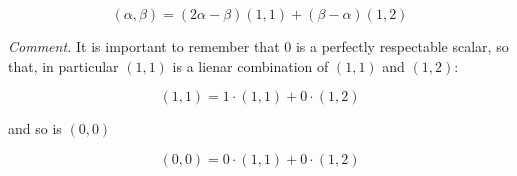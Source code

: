 \begin{equation}
    (\alpha, \beta) = (2\alpha - \beta) (1,1) + (\beta - \alpha) (1,2)
\end{equation}

\textit{Comment.} It is important to remember that $0$ is a perfectly respectable scalar, so that, in particular $(1,1)$ is a lienar combination of $(1,1)$ and $(1,2)$:

\begin{equation}
    (1,1) = 1 \cdot (1,1) + 0 \cdot (1,2)
\end{equation}

and so is $(0,0)$

\begin{equation}
    (0,0) = 0 \cdot (1,1) + 0\cdot(1,2)
\end{equation}